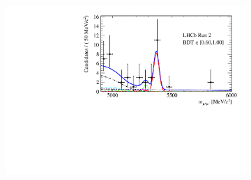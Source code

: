 {{\begin{figure}[htbp]
\begin{subfigure}[b]{0.48\textwidth}
    \end{subfigure}
    ~ %
    \begin{subfigure}[b]{0.48\textwidth}
       \includegraphics[width=\textwidth]{./Figs/BFAnalysis/Fig17h.pdf}
    \end{subfigure}


\end{figure}}}
